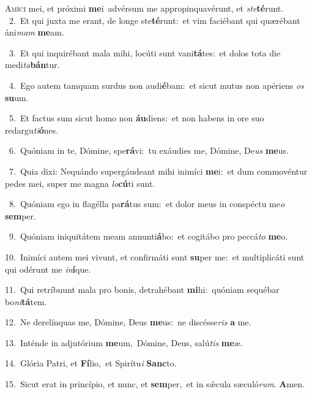 \lettrine{\initial\textcolor{\initialcolor}{A}}{míci} mei, et próximi \textbf{me}\-i~\star advérsum me appropinquavérunt, et \textit{ste}\-\textbf{té}runt.\\
{\numbfont\textcolor{\numbcolor}{~2.}}~Et qui juxta me erant, de longe ste\-\textbf{té}\-runt:~\star et vim faciébant qui quærébant áni\textit{mam} \textbf{me}\-am.\par
{\numbfont\textcolor{\numbcolor}{~3.}}~Et qui inquirébant mala mihi, locúti sunt vani\-\textbf{tá}\-tes:~\star et dolos tota die medi\-\textit{ta}\-\textbf{bán}tur.\par
{\numbfont\textcolor{\numbcolor}{~4.}}~Ego autem tamquam surdus non audi\-\textbf{é}\-bam:~\star et sicut mutus non apériens \textit{os} \textbf{su}\-um.\par
{\numbfont\textcolor{\numbcolor}{~5.}}~Et factus sum sicut homo non \textbf{áu}\-diens:~\star et non habens in ore suo redargu\-\textit{ti}\-\textbf{ó}nes.\par
{\numbfont\textcolor{\numbcolor}{~6.}}~Quóniam in te, Dómine, spe\-\textbf{rá}\-vi:~\star tu exáudies me, Dómine, De\textit{us} \textbf{me}\-us.\par
{\numbfont\textcolor{\numbcolor}{~7.}}~Quia dixi: Nequándo supergáudeant mihi inimíci \textbf{me}\-i:~\star et dum commovéntur pedes mei, super me magna \textit{lo}\-\textbf{cú}ti sunt.\par
{\numbfont\textcolor{\numbcolor}{~8.}}~Quóniam ego in flagélla pa\-\textbf{rá}\-tus sum:~\star et dolor meus in conspéctu me\textit{o} \textbf{sem}\-per.\par
{\numbfont\textcolor{\numbcolor}{~9.}}~Quóniam iniquitátem meam annunti\-\textbf{á}\-bo:~\star et cogitábo pro peccá\textit{to} \textbf{me}\-o.\par
{\numbfont\textcolor{\numbcolor}{10.}}~Inimíci autem mei vivunt, et confirmáti sunt \textbf{su}\-per me:~\star et multiplicáti sunt qui odérunt me \textit{in}\-\textbf{í}que.\par
{\numbfont\textcolor{\numbcolor}{11.}}~Qui retríbuunt mala pro bonis, detrahébant \textbf{mi}\-hi:~\star quóniam sequébar bo\-\textit{ni}\-\textbf{tá}tem.\par
{\numbfont\textcolor{\numbcolor}{12.}}~Ne derelínquas me, Dómine, Deus \textbf{me}\-us:~\star ne discésse\textit{ris} \textbf{a} me.\par
{\numbfont\textcolor{\numbcolor}{13.}}~Inténde in adjutórium \textbf{me}\-um,~\star Dómine, Deus, salú\textit{tis} \textbf{me}\-æ.\par
{\numbfont\textcolor{\numbcolor}{14.}}~Glória Patri, et \textbf{Fí}\-lio,~\star et Spirítu\textit{i} \textbf{Sanc}\-to.\par
{\numbfont\textcolor{\numbcolor}{15.}}~Sicut erat in princípio, et nunc, et \textbf{sem}\-per,~\star et in sǽcula sæculó\-\textit{rum}\-. \textbf{A}\-men.\par
